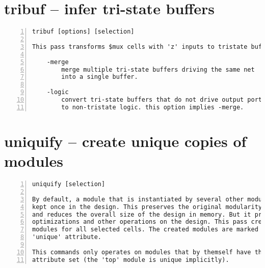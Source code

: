 \section{tribuf -- infer tri-state buffers}
\label{cmd:tribuf}
\begin{lstlisting}[numbers=left,frame=single]
    tribuf [options] [selection]

This pass transforms $mux cells with 'z' inputs to tristate buffers.

    -merge
        merge multiple tri-state buffers driving the same net
        into a single buffer.

    -logic
        convert tri-state buffers that do not drive output ports
        to non-tristate logic. this option implies -merge.
\end{lstlisting}

\section{uniquify -- create unique copies of modules}
\label{cmd:uniquify}
\begin{lstlisting}[numbers=left,frame=single]
    uniquify [selection]

By default, a module that is instantiated by several other modules is only
kept once in the design. This preserves the original modularity of the design
and reduces the overall size of the design in memory. But it prevents certain
optimizations and other operations on the design. This pass creates unique
modules for all selected cells. The created modules are marked with the
'unique' attribute.

This commands only operates on modules that by themself have the 'unique'
attribute set (the 'top' module is unique implicitly).
\end{lstlisting}

